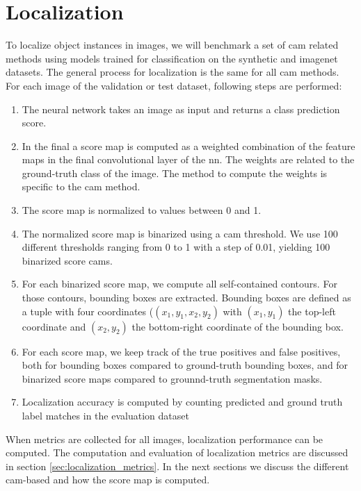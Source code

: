 \section{Localization}
To localize object instances in images, we will benchmark a set of \acrshort{cam} related methods using models trained for classification on the synthetic and imagenet datasets. The general process for localization is the same for all \acrshort{cam} methods. For each image of the validation or test dataset, following steps are performed:
\begin{enumerate}
    \item The neural network takes an image as input and returns a class prediction score.
    \item In the final a score map is computed as a weighted combination of the feature maps in the final convolutional layer of the \acrshort{nn}. The weights are related to the ground-truth class of the image. The method to compute the weights is specific to the \acrshort{cam} method.
    \item The score map is normalized to values between 0 and 1.
    \item The normalized score map is binarized using a \acrshort{cam} threshold. We use 100 different thresholds ranging from 0 to 1 with a step of 0.01, yielding 100 binarized score cams.
    \item For each binarized score map, we compute all self-contained contours. For those contours, bounding boxes are extracted. Bounding boxes are defined as a tuple with four coordinates ($(x_1, y_1, x_2, y_2)$ with $(x_1, y_1)$ the top-left coordinate and $(x_2, y_2)$ the bottom-right coordinate of the bounding box.
    \item For each score map, we keep track of the true positives and false positives, both for bounding boxes compared to ground-truth bounding boxes, and for binarized score maps compared to grounnd-truth segmentation masks.
    \item Localization accuracy is computed by counting predicted and ground truth label matches in the evaluation dataset
\end{enumerate}
When metrics are collected for all images, localization performance can be computed. The computation and evaluation of localization metrics are discussed in section \ref{sec:localization_metrics}. In the next sections we discuss the different \acrshort{cam}-based and how the score map is computed.

